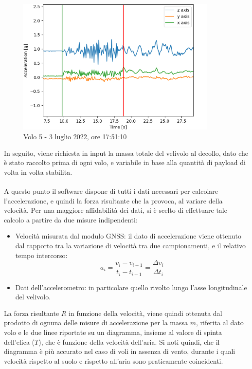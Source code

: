\documentclass[12pt]{article}
\begin{document}
\begin{figure}[H]
	\centering
	\includegraphics[width=10cm]{img/select-to-2}
	\captionsetup{labelformat=empty}
	\caption{Volo 5 - 3 luglio 2022, ore 17:51:10}
\end{figure}

\noindent
In seguito, viene richiesta in input la massa totale del velivolo al decollo, dato che è stato raccolto prima di ogni volo, e variabile in base alla quantità di payload di volta in volta stabilita.
\\\\
A questo punto il software dispone di tutti i dati necessari per calcolare l'accelerazione, e quindi la forza risultante che la provoca, al variare della velocità. Per una maggiore affidabilità dei dati, si è scelto di effettuare tale calcolo a partire da due misure indipendenti:
\begin{itemize}
\item Velocità misurata dal modulo GNSS: il dato di accelerazione viene ottenuto dal rapporto tra la variazione di velocità tra due campionamenti, e il relativo tempo intercorso: 
\begin{equation}
a_i = \frac{v_i - v_{i-1}}{t_i - t_{i-1}} = \frac{\Delta v_i}{\Delta t_i}
\end{equation}

\item Dati dell'accelerometro: in particolare quello rivolto lungo l'asse longitudinale del velivolo. 
\end{itemize}

\noindent
La forza risultante $R$ in funzione della velocità, viene quindi ottenuta dal prodotto di ognuna delle misure di accelerazione per la massa $m$, riferita al dato volo e le due linee riportate su un diagramma, insieme al valore di spinta dell'elica ($T$), che è funzione della velocità dell'aria. Si noti quindi, che il diagramma è più accurato nel caso di voli in assenza di vento, durante i quali velocità rispetto al suolo e rispetto all'aria sono praticamente coincidenti.
\end{document}
